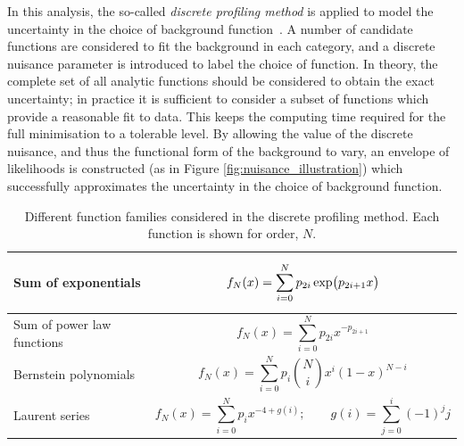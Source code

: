 In this analysis, the so-called \textit{discrete profiling method} is applied to model the uncertainty in the choice of background function~\cite{Dauncey:2014xga}. A number of candidate functions are considered to fit the background in each category, and a discrete nuisance parameter is introduced to label the choice of function. In theory, the complete set of all analytic functions should be considered to obtain the exact uncertainty; in practice it is sufficient to consider a subset of functions which provide a reasonable fit to data. This keeps the computing time required for the full minimisation to a tolerable level. By allowing the value of the discrete nuisance, and thus the functional form of the background to vary, an envelope of likelihoods is constructed (as in Figure \ref{fig:nuisance_illustration}) which successfully approximates the uncertainty in the choice of background function.

\begin{table}[htb]
    \caption[Function families considered in the discrete profiling method]{Different function families considered in the discrete profiling method. Each function is shown for order, $N$.}
    \label{tab:discrete_functions}
    \vspace{.5cm}
    \centering
    \footnotesize
    \renewcommand{\arraystretch}{1}
    \begin{tabular}{m{}|p{}}
       Sum of exponentials & 
       \begin{equation*}
           f_N(x) = \sum^N_{i=0} p_{2i}\,{\rm{exp}}\big( p_{2i+1}x\big)
       \end{equation*} \\ \hline
       Sum of power law functions & 
       \begin{equation*}
           f_N(x) = \sum^N_{i=0} p_{2i}x^{-p_{2i+1}}
       \end{equation*} \\ \hline
       Bernstein polynomials & 
       \begin{equation*}
           f_N(x) = \sum^N_{i=0} p_i {N \choose i}x^i(1-x)^{N-i}
       \end{equation*} \\ \hline
       Laurent series &
       \begin{equation*}
           f_N(x) = \sum^N_{i=0} p_i x^{-4+g(i)}; \qquad g(i) = \sum^i_{j=0} (-1)^jj
       \end{equation*} \\      
    \end{tabular}
\end{table}

